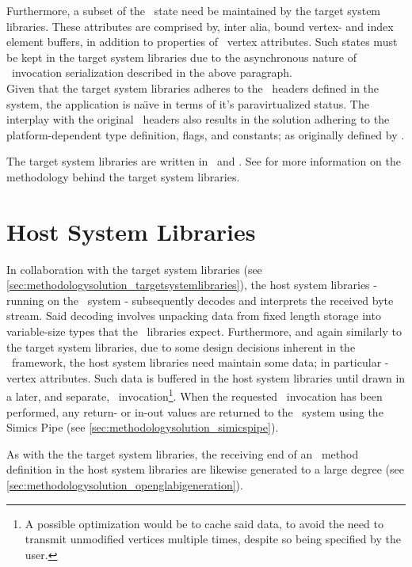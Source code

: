 Furthermore, a subset of the \dvttermopengl\ state need be maintained by the target system libraries.
These attributes are comprised by, inter alia, bound vertex- and index element buffers, in addition to properties of \dvttermopengl\ vertex attributes.
Such states must be kept in the target system libraries due to the asynchronous nature of \dvttermopengl\ invocation serialization described in the above paragraph.\\

\noindent
Given that the target system libraries adheres to the \dvttermopengl\ headers defined in the system, the application is na\"{\i}ve in terms of it's paravirtualized status.
The interplay with the original \dvttermopengles\ headers also results in the solution adhering to the platform-dependent type definition, flags, and constants; as originally defined by \dvttermkhronos .

The target system libraries are written in \dvttermc\ and \dvttermcplusplus .
See  for more information on the methodology behind the target system libraries.

\section{Host System Libraries}
\label{sec:methodologysolution_hostsystemlibraries}
In collaboration with the target system libraries (see \ref{sec:methodologysolution_targetsystemlibraries}), the host system libraries - running on the \dvttermhost\ system - subsequently decodes and interprets the received byte stream.
Said decoding involves unpacking data from fixed length storage into variable-size types that the \dvttermopengl\ libraries expect.
Furthermore, and again similarly to the target system libraries, due to some design decisions inherent in the \dvttermopenglestwopointo\ framework, the host system libraries need maintain some data; in particular - vertex attributes.
Such data is buffered in the host system libraries until drawn in a later, and separate, \dvttermopengl\ invocation\footnote{A possible optimization would be to cache said data, to avoid the need to transmit unmodified vertices multiple times, despite so being specified by the user.}.
When the requested \dvttermopengl\ invocation has been performed, any return- or in-out values are returned to the \dvttermtarget\ system using the Simics Pipe (see \ref{sec:methodologysolution_simicspipe}).

As with the the target system libraries, the receiving end of an \dvttermopengl\ method definition in the host system libraries are likewise generated to a large degree (see \ref{sec:methodologysolution_openglabigeneration}).

